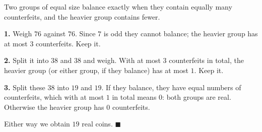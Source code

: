 Two groups of equal size balance exactly when they contain equally many counterfeits, and the heavier group contains fewer.

\textbf{1.} Weigh $76$ against $76$. Since $7$ is odd they cannot balance; the heavier group has at most $3$ counterfeits. Keep it.

\textbf{2.} Split it into $38$ and $38$ and weigh. With at most $3$ counterfeits in total, the heavier group (or either group, if they balance) has at most $1$. Keep it.

\textbf{3.} Split these $38$ into $19$ and $19$. If they balance, they have equal numbers of counterfeits, which with at most $1$ in total means $0$: both groups are real. Otherwise the heavier group has $0$ counterfeits.

Either way we obtain $19$ real coins. $\blacksquare$
